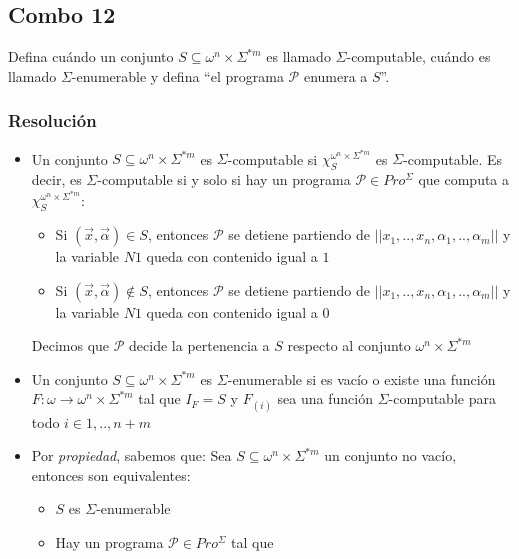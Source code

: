 \documentclass[
]{article}
\providecommand{\tightlist}{%
  \setlength{\itemsep}{0pt}\setlength{\parskip}{0pt}}
\begin{document}
\subsection{Combo 12}\label{combo-12}

Defina cuándo un conjunto \(S\subseteq\omega^n\times\Sigma^{*m}\) es
llamado \(\Sigma\)-computable, cuándo es llamado \(\Sigma\)-enumerable y
defina ``el programa \(\mathcal{P}\) enumera a \(S\)''.

\subsubsection{Resolución}\label{resoluciuxf3n-11}

\begin{itemize}
\tightlist
\item
  Un conjunto \(S\subseteq\omega^n\times\Sigma^{*m}\) es
  \(\Sigma\)-computable si \(\chi_S^{\omega^n\times\Sigma^{*m}}\) es
  \(\Sigma\)-computable. Es decir, es \(\Sigma\)-computable si y solo si
  hay un programa \(\mathcal{P}\in Pro^\Sigma\) que computa a
  \(\chi_S^{\omega^n\times\Sigma^{*m}}\):

  \begin{itemize}
  \tightlist
  \item
    Si \((\vec{x}, \vec{\alpha})\in S\), entonces \(\mathcal{P}\) se
    detiene partiendo de \(||x_1, .., x_n, \alpha_1, .., \alpha_m||\) y
    la variable \(N1\) queda con contenido igual a \(1\)
  \item
    Si \((\vec{x}, \vec{\alpha})\notin S\), entonces \(\mathcal{P}\) se
    detiene partiendo de \(||x_1, .., x_n, \alpha_1, .., \alpha_m||\) y
    la variable \(N1\) queda con contenido igual a \(0\)
  \end{itemize}

  Decimos que \(\mathcal{P}\) decide la pertenencia a \(S\) respecto al
  conjunto \(\omega^n\times\Sigma^{*m}\)
\item
  Un conjunto \(S\subseteq\omega^n\times\Sigma^{*m}\) es
  \(\Sigma\)-enumerable si es vacío o existe una función
  \(F:\omega\to\omega^n\times\Sigma^{*m}\) tal que \(I_F=S\) y
  \(F_{(i)}\) sea una función \(\Sigma\)-computable para todo
  \(i\in{1,..,n+m}\)
\item
  Por \emph{propiedad}, sabemos que: Sea
  \(S\subseteq\omega^n\times\Sigma^{*m}\) un conjunto no vacío, entonces
  son equivalentes:

  \begin{itemize}
  \tightlist
  \item
    \(S\) es \(\Sigma\)-enumerable
  \item
    Hay un programa \(\mathcal{P}\in Pro^\Sigma\) tal que


\end{itemize}
\end{itemize}
\end{document}
